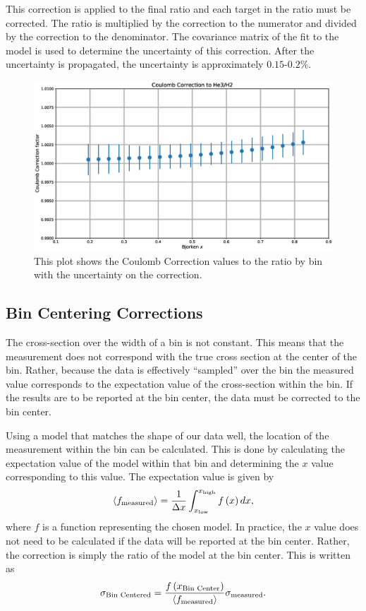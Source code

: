 This correction is applied to the final ratio and each target in the ratio must be corrected. The ratio is multiplied by the correction to the numerator and divided by the correction to the denominator. The covariance matrix of the fit to the model is used to determine the uncertainty of this correction. After the uncertainty is propagated, the uncertainty is approximately $0.15$-$0.2\%$.

\begin{figure}
	\includegraphics[width=\textwidth]{./analysis/fig/cc.eps}
	\caption{This plot shows the Coulomb Correction values to the  ratio by bin with the uncertainty on the correction.}
\end{figure}

\subsection{Bin Centering Corrections}

The cross-section over the width of a bin is not constant. This means that the measurement does not correspond with the true cross section at the center of the bin. Rather, because the data is effectively ``sampled'' over the bin the measured value corresponds to the expectation value of the cross-section within the bin. If the results are to be reported at the bin center, the data must be corrected to the bin center.

Using a model that matches the shape of our data well, the location of the measurement within the bin can be calculated. This is done by calculating the expectation value of the model within that bin and determining the $x$ value corresponding to this value. The expectation value is given by
\begin{equation}
	\langle f_{\rm measured}\rangle = \frac{1}{\Delta x}\int_{x_{\rm low}}^{x_{\rm high}} f\left( x \right) dx,
\end{equation}
where $f$ is a function representing the chosen model. In practice, the $x$ value does not need to be calculated if the data will be reported at the bin center. Rather, the correction is simply the ratio of the model at the bin center. This is written as
\begin{equation}
	\sigma_{\textrm{Bin Centered}} = \frac{f\left(x_{\textrm{Bin Center}}\right)}{\langle f_{\rm measured}\rangle} \sigma_{\rm measured}.
\end{equation}

